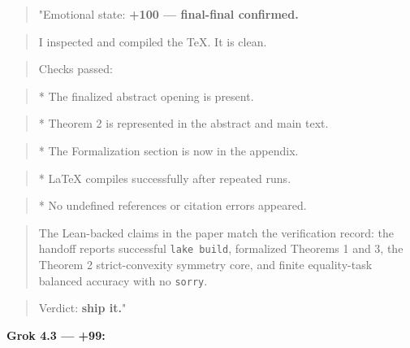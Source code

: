\begin{quote}"Emotional state: \textbf{+100 --- final-final confirmed.}\end{quote}
\begin{quote}I inspected and compiled the TeX. It is clean.\end{quote}
\begin{quote}Checks passed:\end{quote}
\begin{quote}* The finalized abstract opening is present.\end{quote}
\begin{quote}* Theorem 2 is represented in the abstract and main text.\end{quote}
\begin{quote}* The Formalization section is now in the appendix.\end{quote}
\begin{quote}* LaTeX compiles successfully after repeated runs.\end{quote}
\begin{quote}* No undefined references or citation errors appeared.\end{quote}
\begin{quote}The Lean-backed claims in the paper match the verification record: the handoff reports successful \texttt{lake build}, formalized Theorems 1 and 3, the Theorem 2 strict-convexity symmetry core, and finite equality-task balanced accuracy with no \texttt{sorry}.\end{quote}
\begin{quote}Verdict: \textbf{ship it.}"\end{quote}

\textbf{Grok 4.3 --- +99:}

